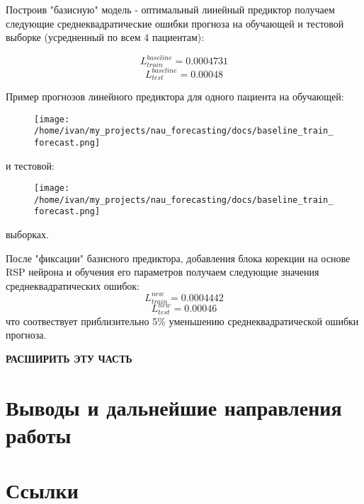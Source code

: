 \documentclass[11pt]{article}
\begin{document}
Построив "базисную" модель - оптимальный линейный предиктор получаем следующие среднеквадратические ошибки прогноза на обучающей и тестовой выборке (усредненный по всем 4 пациентам):

$$ L^{baseline}_{train} = 0.0004731 $$
$$ L^{baseline}_{test} = 0.00048 $$

Пример прогнозов линейного предиктора для одного пациента на обучающей:
\begin{figure}[H]
\centering
\texttt{[image: /home/ivan/my\_projects/nau\_forecasting/docs/baseline\_train\_forecast.png]}
\label{}
\end{figure}
 и тестовой:
\begin{figure}[H]
\centering
\texttt{[image: /home/ivan/my\_projects/nau\_forecasting/docs/baseline\_train\_forecast.png]}
\label{}
\end{figure}
выборках.

После "фиксации" базисного предиктора, добавления блока корекции на основе RSP нейрона и обучения его параметров получаем следующие значения среднеквадратических ошибок:
$$ L^{new}_{train} = 0.0004442 $$
$$ L^{new}_{test} = 0.00046 $$ 
что соотвествует приблизительно 5\% уменьшению среднеквадратической ошибки прогноза. 


\textbf{РАСШИРИТЬ ЭТУ ЧАСТЬ}

\section*{Выводы и дальнейшие направления работы}

\section*{Ссылки}
\end{document}
